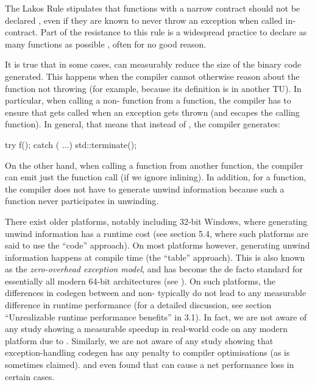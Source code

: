 The Lakos Rule stipulates that functions with a narrow contract should not be declared , even if they are known to never throw an exception when called in-contract. Part of the resistance to this rule is a widespread practice to declare as many functions as possible , often for no good reason.

It is true that in some cases,  can measurably reduce the size of the binary code generated. This happens when the compiler cannot otherwise reason about the function not throwing (for example, because its definition is in another TU). In particular, when calling a non- function  from a  function, the compiler has to ensure that  gets called when an exception gets thrown (and escapes the calling function). In general, that means that instead of , the compiler generates:
\begin{codeblock}
try { f(); } catch ( ...) { std::terminate(); }
\end{codeblock}
On the other hand, when calling a  function from another  function, the compiler can emit just the function call (if we ignore inlining). In addition, for a  function, the compiler does not have to generate unwind information because such a function never participates in unwinding.

There exist older platforms, notably including 32-bit Windows, where generating unwind information has a runtime cost (see \cite{TR18015} section 5.4, where such platforms are said to use the ``code'' approach). On most platforms however, generating unwind information happens at compile time (the ``table'' approach). This is also known as the \emph{zero-overhead exception model}, and has become the de facto standard for essentially all modern 64-bit architectures (see \cite{Mortoray2013}). On such platforms, the differences in codegen between  and non- typically do not lead to any measurable difference in runtime performance (for a detailed discussion, see section ``Unrealizable runtime performance benefits'' in \cite{EMC++S} 3.1). In fact, we are not aware of any study showing a measurable speedup in real-world code on any modern platform due to . Similarly, we are not aware of any study showing that exception-handling codegen has any penalty to compiler optimisations (as is sometimes claimed). \cite{Mahaffey2017} and \cite{Dekker2019} even found that  can cause a net performance loss in certain cases.

